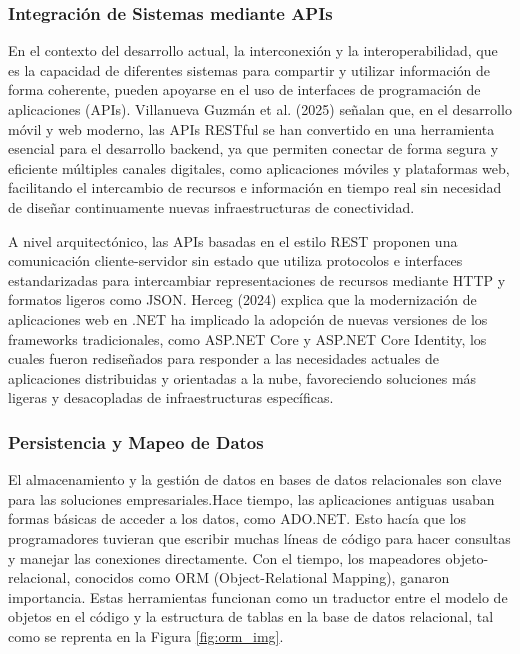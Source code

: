 \subsubsection{Integración de Sistemas mediante APIs}
\label{sec:integracion_sistemas}
En el contexto del desarrollo actual, la interconexión y la interoperabilidad, que es la capacidad de diferentes sistemas para compartir y utilizar información de forma coherente, pueden apoyarse en el uso de interfaces de programación de aplicaciones (APIs). Villanueva Guzmán et al. (2025) señalan que, en el desarrollo móvil y web moderno, las APIs RESTful se han convertido en una herramienta esencial para el desarrollo backend, ya que permiten conectar de forma segura y eficiente múltiples canales digitales, como aplicaciones móviles y plataformas web, facilitando el intercambio de recursos e información en tiempo real sin necesidad de diseñar continuamente nuevas infraestructuras de conectividad.\cite{VillanuevaGuzman2025RestfulAPIs}

A nivel arquitectónico, las APIs basadas en el estilo REST proponen una comunicación cliente-servidor sin estado que utiliza protocolos e interfaces estandarizadas para intercambiar representaciones de recursos mediante HTTP y formatos ligeros como JSON. Herceg (2024) explica que la modernización de aplicaciones web en .NET ha implicado la adopción de nuevas versiones de los frameworks tradicionales, como ASP.NET Core y ASP.NET Core Identity, los cuales fueron rediseñados para responder a las necesidades actuales de aplicaciones distribuidas y orientadas a la nube, favoreciendo soluciones más ligeras y desacopladas de infraestructuras específicas.\cite{herceg2024modernizing}
\subsubsection{Persistencia y Mapeo de Datos}
\label{sec:persistencia_mapeo}
El almacenamiento y la gestión de datos en bases de datos relacionales son clave para las soluciones empresariales.Hace tiempo, las aplicaciones antiguas usaban formas básicas de acceder a los datos, como ADO.NET. Esto hacía que los programadores tuvieran que escribir muchas líneas de código para hacer consultas y manejar las conexiones directamente. Con el tiempo, los mapeadores objeto-relacional, conocidos como ORM (Object-Relational Mapping), ganaron importancia. Estas herramientas funcionan como un traductor entre el modelo de objetos en el código y la estructura de tablas en la base de datos relacional, tal como se reprenta en la Figura \ref{fig:orm_img}.

